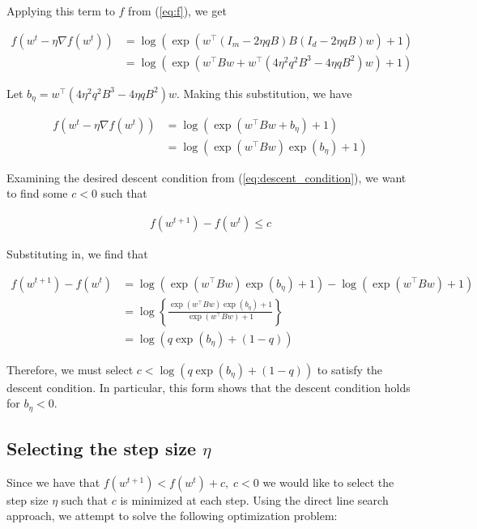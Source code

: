 \documentclass[11pt]{article}
\begin{document}
Applying this term to $f$ from (\ref{eq:f}), we get

\begin{equation}
\begin{split}
    f(w^t - \eta \nabla f(w^t)) 
    &= \log(\exp(w^{\top}(I_m - 2 \eta qB)B(I_d - 2 \eta qB)w) + 1) \\
    &= \log(\exp(w^{\top}Bw + w^{\top} ( 4 \eta^2 q^2 B^3 - 4 \eta q B^2)w) + 1)
\end{split}
\end{equation}

Let $b_\eta = w^{\top} ( 4 \eta^2 q^2 B^3 - 4 \eta q B^2)w$. Making this substitution, we have

\begin{equation}
\begin{split}
    f(w^t - \eta \nabla f(w^t)) 
    &= \log(\exp(w^{\top}Bw + b_\eta ) + 1) \\
    &= \log(\exp(w^{\top}Bw)\exp(b_\eta ) + 1)
\end{split}
\end{equation}

Examining the desired descent condition from (\ref{eq:descent_condition}), we want to find some $c < 0$ such that

\begin{align*}
    f(w^{t+1}) - f(w^t) \leq c
\end{align*}

Substituting in, we find that

\begin{align*}
    f(w^{t+1}) - f(w^t) &= 
    \log(\exp(w^{\top}Bw)\exp(b_\eta ) + 1) - \log(\exp(w^{\top}Bw) + 1) \\
    &= \log \left\{ \frac{\exp(w^{\top}Bw)\exp(b_\eta ) + 1}{\exp(w^{\top}Bw) + 1} \right\} \\
    &= \log( q \exp(b_\eta ) + (1 - q))
\end{align*}

Therefore, we must select $c < \log( q \exp(b_\eta ) + (1 - q))$ to satisfy the descent condition. In particular, this form shows that the descent condition holds for $b_\eta < 0$.

\subsection{Selecting the step size $\eta$}

Since we have that $f(w^{t+1}) < f(w^t) + c, \; c < 0$ we would like to select the step size $\eta$ such that $c$ is minimized at each step. Using the direct line search approach, we attempt to solve the following optimization problem:
\end{document}
